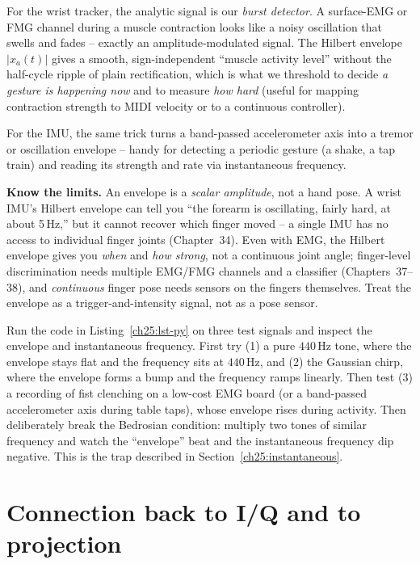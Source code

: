 \begin{goalbox}
For the wrist tracker, the analytic signal is our \emph{burst detector}. A surface-EMG or
FMG channel during a muscle contraction looks like a noisy oscillation that swells and
fades -- exactly an amplitude-modulated signal. The Hilbert envelope $|x_a(t)|$ gives a
smooth, sign-independent ``muscle activity level'' without the half-cycle ripple of plain
rectification, which is what we threshold to decide \emph{a gesture is happening now} and
to measure \emph{how hard} (useful for mapping contraction strength to MIDI velocity or to
a continuous controller).

For the IMU, the same trick turns a band-passed accelerometer axis into a tremor or
oscillation envelope -- handy for detecting a periodic gesture (a shake, a tap train) and
reading its strength and rate via instantaneous frequency.

\textbf{Know the limits.} An envelope is a \emph{scalar amplitude}, not a hand
pose. A wrist IMU's Hilbert envelope can tell you ``the forearm is oscillating, fairly
hard, at about 5\,Hz,'' but it cannot recover which finger moved -- a single IMU has no
access to individual finger joints (Chapter~34). Even with EMG, the Hilbert envelope gives
you \emph{when} and \emph{how strong}, not a continuous joint angle; finger-level
discrimination needs multiple EMG/FMG channels and a classifier (Chapters~37--38), and
\emph{continuous} finger pose needs sensors on the fingers themselves. Treat the envelope
as a trigger-and-intensity signal, not as a pose sensor.
\end{goalbox}

\begin{labbox}
Run the code in Listing~\ref{ch25:lst-py} on three test signals and inspect the envelope and
instantaneous frequency. First try (1) a pure $440$\,Hz tone, where the envelope stays flat and the
frequency sits at $440$\,Hz, and (2) the Gaussian chirp, where the envelope forms a bump and the frequency
ramps linearly. Then test (3) a recording of fist clenching on a low-cost EMG board (or a band-passed accelerometer axis during table taps), whose envelope rises
during activity. Then deliberately break the Bedrosian condition: multiply two tones of
similar frequency and watch the ``envelope'' beat and the instantaneous frequency dip
negative. This is the trap described in Section~\ref{ch25:instantaneous}.
\end{labbox}

\section{Connection back to I/Q and to projection}
\label{ch25:iq}

